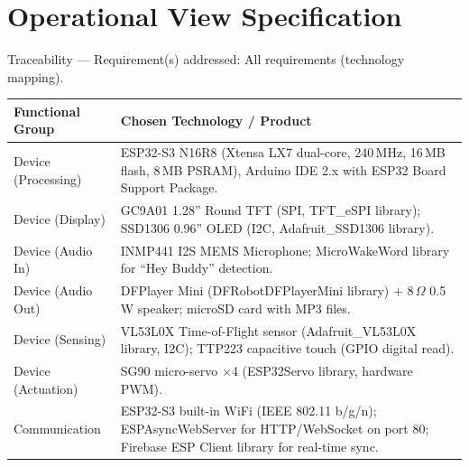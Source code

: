 \documentclass[12pt,a4paper]{article}
\begin{document}
\newpage
\section{Operational View Specification}

\begin{tracebox}
Traceability --- Requirement(s) addressed: All requirements (technology
mapping).
\end{tracebox}

\vspace{0.3cm}

\begin{center}
\label{tab:opview}
\scriptsize
\begin{tabular}{|L{0.18\textwidth}|L{0.70\textwidth}|}
\hline
\textbf{Functional Group} & \textbf{Chosen Technology / Product} \\ \hline
Device (Processing) & ESP32-S3 N16R8 (Xtensa LX7 dual-core, 240\,MHz,
                      16\,MB flash, 8\,MB PSRAM), Arduino IDE 2.x with
                      ESP32 Board Support Package. \\ \hline
Device (Display) & GC9A01 1.28'' Round TFT (SPI, TFT\_eSPI library);
                   SSD1306 0.96'' OLED (I2C, Adafruit\_SSD1306
                   library). \\ \hline
Device (Audio In) & INMP441 I2S MEMS Microphone; MicroWakeWord library
                    for ``Hey Buddy'' detection. \\ \hline
Device (Audio Out) & DFPlayer Mini (DFRobotDFPlayerMini library) +
                     8\,$\Omega$ 0.5\,W speaker; microSD card with
                     MP3 files. \\ \hline
Device (Sensing) & VL53L0X Time-of-Flight sensor (Adafruit\_VL53L0X
                   library, I2C); TTP223 capacitive touch (GPIO
                   digital read). \\ \hline
Device (Actuation) & SG90 micro-servo $\times$4 (ESP32Servo library,
                     hardware PWM). \\ \hline
Communication & ESP32-S3 built-in WiFi (IEEE 802.11 b/g/n);
               ESPAsyncWebServer for HTTP/WebSocket on port 80;
               Firebase ESP Client library for real-time sync. \\ \hline

\end{tabular}
\end{center}
\end{document}

